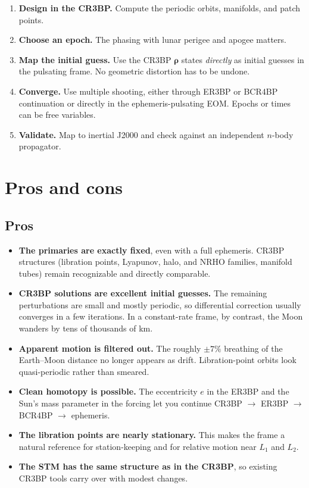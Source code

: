 \documentclass[11pt]{article}
\newcommand{\rhov}{\bm{\rho}}
\begin{document}
\begin{enumerate}
  \item \textbf{Design in the CR3BP.} Compute the periodic orbits, manifolds, and patch points.
  \item \textbf{Choose an epoch.} The phasing with lunar perigee and apogee matters.
  \item \textbf{Map the initial guess.} Use the CR3BP $\rhov$ states \emph{directly} as initial guesses in the pulsating frame. No geometric distortion has to be undone.
  \item \textbf{Converge.} Use multiple shooting, either through ER3BP or BCR4BP continuation or directly in the ephemeris-pulsating EOM. Epochs or times can be free variables.
  \item \textbf{Validate.} Map to inertial J2000 and check against an independent $n$-body propagator.
\end{enumerate}

\section{Pros and cons}

\subsection{Pros}

\begin{itemize}
  \item \textbf{The primaries are exactly fixed}, even with a full ephemeris. CR3BP structures (libration points, Lyapunov, halo, and NRHO families, manifold tubes) remain recognizable and directly comparable.
  \item \textbf{CR3BP solutions are excellent initial guesses.} The remaining perturbations are small and mostly periodic, so differential correction usually converges in a few iterations. In a constant-rate frame, by contrast, the Moon wanders by tens of thousands of km.
  \item \textbf{Apparent motion is filtered out.} The roughly $\pm7\%$ breathing of the Earth--Moon distance no longer appears as drift. Libration-point orbits look quasi-periodic rather than smeared.
  \item \textbf{Clean homotopy is possible.} The eccentricity $e$ in the ER3BP and the Sun's mass parameter in the forcing let you continue CR3BP $\to$ ER3BP $\to$ BCR4BP $\to$ ephemeris.
  \item \textbf{The libration points are nearly stationary.} This makes the frame a natural reference for station-keeping and for relative motion near $L_1$ and $L_2$.
  \item \textbf{The STM has the same structure as in the CR3BP}, so existing CR3BP tools carry over with modest changes.
\end{itemize}
\end{document}
